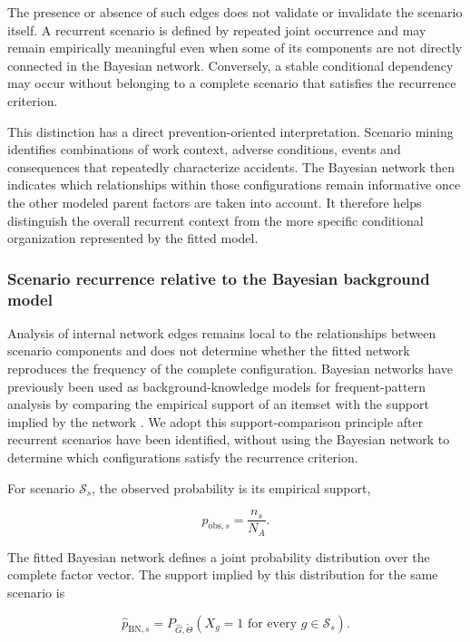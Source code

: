 The presence or absence of such edges does not validate or invalidate the
scenario itself. A recurrent scenario is defined by repeated joint occurrence
and may remain empirically meaningful even when some of its components are
not directly connected in the Bayesian network. Conversely, a stable
conditional dependency may occur without belonging to a complete scenario
that satisfies the recurrence criterion.

This distinction has a direct prevention-oriented interpretation. Scenario
mining identifies combinations of work context, adverse conditions, events
and consequences that repeatedly characterize accidents. The Bayesian network
then indicates which relationships within those configurations remain
informative once the other modeled parent factors are taken into account.
It therefore helps distinguish the overall recurrent context from the more
specific conditional organization represented by the fitted model.


\subsubsection{Scenario recurrence relative to the Bayesian background model}
\label{sec:chap4_scenario_bn_expected}

Analysis of internal network edges remains local to the relationships between
scenario components and does not determine whether the fitted network
reproduces the frequency of the complete configuration. Bayesian networks
have previously been used as background-knowledge models for frequent-pattern
analysis by comparing the empirical support of an itemset with the support
implied by the network
\citep{jaroszewicz2004interestingness,
jaroszewicz2009scalable}. We adopt this support-comparison principle after
recurrent scenarios have been identified, without using the Bayesian network
to determine which configurations satisfy the recurrence criterion.

For scenario \(\mathcal S_s\), the observed probability is its empirical
support,

\[
\widehat p_{\mathrm{obs},s}
=
\frac{n_s}{N_A}.
\]

The fitted Bayesian network defines a joint probability distribution over the
complete factor vector. The support implied by this distribution for the same
scenario is

\[
\widehat p_{\mathrm{BN},s}
=
P_{\widehat G,\widetilde\Theta}
\left(
X_g=1
\text{ for every }
g\in\mathcal S_s
\right).
\]

